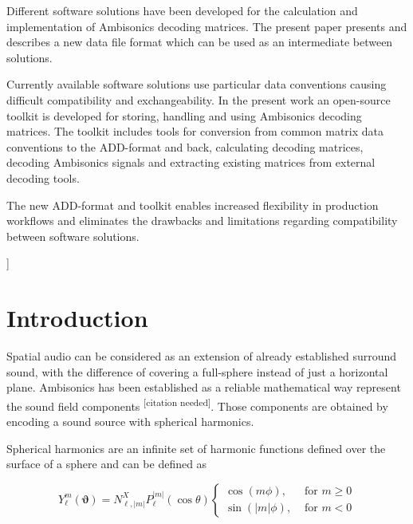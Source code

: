 \documentclass[a4paper, 10pt, twocolumn]{article}
\newcommand{\citationneeded}[1][]{\textsuperscript{\color{black} [citation needed]}}
\begin{document}
{\vspace{-3mm}}
\begin{onecolabstract}
{\vspace{3mm}}

Different software solutions have been developed for the calculation and implementation of Ambisonics decoding matrices. The present paper presents and describes a new data file format which can be used as an intermediate between solutions.

Currently available software solutions use particular data conventions causing difficult compatibility and exchangeability. In the present work an open-source toolkit is developed for storing, handling and using Ambisonics decoding matrices. The toolkit includes tools for conversion from common matrix data conventions to the ADD-format and back, calculating decoding matrices, decoding Ambisonics signals and extracting existing matrices from external decoding tools. 

The new ADD-format and toolkit enables increased flexibility in production workflows and eliminates the drawbacks and limitations regarding compatibility between software solutions.

\end{onecolabstract}
{\vspace{8mm}}]

\section{Introduction} \label{sec:introduction}

Spatial audio can be considered as an extension of already established surround sound, with the difference of covering a full-sphere instead of just a horizontal plane. Ambisonics has been established as a  reliable mathematical way represent the sound field components \citationneeded. Those components are obtained by encoding a sound source with spherical harmonics.

Spherical harmonics are an infinite set of harmonic functions defined over the surface of a sphere and can be defined as 

\begin{equation}
Y_{\ell}^{m}(\boldsymbol{\vartheta})=N_{\ell,|m|}^{X} P_{\ell}^{|m|}(\cos \theta)\left\{\begin{array}{cc}{\cos (m \phi),} & {\text { for } m \geq 0} \\ {\sin (|m| \phi),} & {\text { for } m<0}\end{array}\right.
\end{equation}
\end{document}
